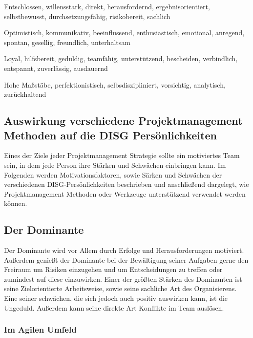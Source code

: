\documentclass[twocolumn,10pt]{asme2ej}
\begin{document}
\begin{description}[align=left]
	\item [Dominant] Entschlossen, willensstark, direkt, herausfordernd, ergebnisorientiert, selbstbewusst, durchsetzungsfähig, risikobereit, sachlich
	\item [Initiativ] Optimistisch, kommunikativ, beeinflussend, enthusiastisch, emotional, anregend, spontan, gesellig, freundlich, unterhaltsam
	\item [Stetig] Loyal, hilfsbereit, geduldig, teamfähig, unterstützend, bescheiden, verbindlich, entspannt, zuverlässig, ausdauernd
	\item [Gewissenhaft] Hohe Maßstäbe, perfektionistisch, selbsdiszipliniert, vorsichtig, analytisch, zurückhaltend
	 \cite{disg_charakteristika}
\end{description}

\subsection{Auswirkung verschiedene Projektmanagement Methoden auf die DISG Persönlichkeiten}
Eines der Ziele jeder Projektmanagement Strategie sollte ein motiviertes Team sein, in dem jede Person ihre Stärken und Schwächen einbringen kann.
 Im Folgenden werden Motivationsfaktoren, sowie Särken und Schwächen der verschiedenen DISG-Persönlichkeiten beschrieben und anschließend dargelegt, wie Projektmanagement Methoden oder Werkzeuge unterstützend verwendet werden können.

\subsection{Der Dominante}
Der Dominante  wird vor Allem durch Erfolge und Herausforderungen motiviert. Außerdem genießt der Dominante bei der Bewältigung seiner Aufgaben gerne den Freiraum um Risiken einzugehen und um Entscheidungen zu treffen oder zumindest auf diese einzuwirken. Einer der größten Stärken des Dominanten ist seine Zielorientierte Arbeitsweise, sowie seine sachliche Art des Organisierens. Eine seiner schwächen, die sich jedoch auch positiv auswirken kann, ist die Ungeduld. Außerdem kann seine direkte Art Konflikte im Team auslösen.

\subsubsection{Im Agilen Umfeld}
\end{document}
